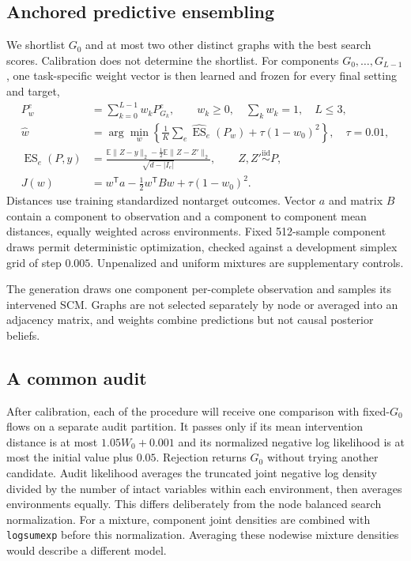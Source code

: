 \documentclass{svproc}
\newcommand{\E}{\mathbb{E}}
\begin{document}
\subsection{Anchored predictive ensembling}
We shortlist $G_0$ and at most two other distinct graphs with the best search
scores. Calibration does not determine the shortlist. For components
$G_0,\ldots,G_{L-1}$, one task-specific weight vector is then learned and frozen
for every final setting and target,
\begin{equation}
\begin{aligned}
 P_w^e&=\sum_{k=0}^{L-1}w_k P_{G_k}^e,
           \qquad w_k\ge0,\quad \sum_k w_k=1,\quad L\le3,\\
 \widehat w&=\arg\min_w\left\{
       \frac{1}{K}\sum_e\widehat{\operatorname{ES}}_e(P_w)
                   +\tau(1-w_0)^2\right\},\quad \tau=0.01,\\
 \operatorname{ES}_e(P,y)&=\frac{\E\|Z-y\|_2-\tfrac12\E\|Z-Z'\|_2}
                                      {\sqrt{d-|I_e|}},
       \qquad Z,Z'\overset{\mathrm{iid}}{\sim}P,\\
 J(w)&=w^{\mathsf T}a-\tfrac12 w^{\mathsf T}Bw+\tau(1-w_0)^2.
\end{aligned}
\label{eq:mixture}
\end{equation}
Distances use training standardized nontarget outcomes. Vector $a$ and matrix
$B$ contain a component to observation and a component to component mean distances,
equally weighted across environments. Fixed 512-sample component draws permit
deterministic optimization, checked against a development simplex grid of step
$0.005$. Unpenalized and uniform mixtures are supplementary controls.

The generation draws one component per-complete observation and samples its
intervened SCM. Graphs are not selected separately by node or averaged into an
adjacency matrix, and weights combine predictions but not causal posterior beliefs.

\subsection{A common audit}
After calibration, each of the procedure will receive one comparison with fixed-$G_0$ flows
on a separate audit partition. It passes only if its mean intervention distance
is at most $1.05W_0+0.001$ and its normalized negative log likelihood is at most
the initial value plus $0.05$. Rejection returns $G_0$ without trying another
candidate. Audit likelihood averages the truncated joint negative log density
divided by the number of intact variables within each environment, then averages
environments equally. This differs deliberately from the node balanced search
normalization. For a mixture, component joint densities are combined with
\texttt{logsumexp} before this normalization. Averaging these nodewise mixture densities
would describe a different model.
\end{document}
